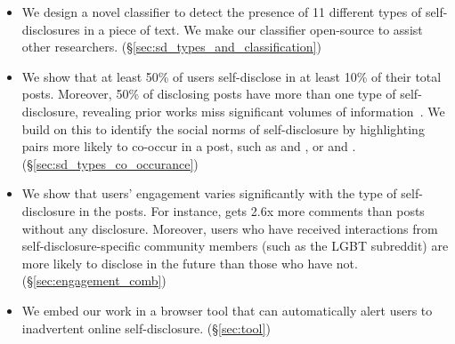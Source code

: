 \begin{itemize}

    \item We design a novel classifier to detect the presence of 11 different types of self-disclosures in a piece of text. We make our classifier open-source to assist other researchers. (\S\ref{sec:sd_types_and_classification})
    
    \item We show that at least 50\% of users self-disclose in at least 10\% of their total posts. Moreover, 50\% of disclosing posts have more than one type of self-disclosure, revealing prior works miss significant volumes of information~\cite{zani_motivating_2022,masur_impact_2023}. We build on this to identify the social norms of self-disclosure by highlighting pairs more likely to co-occur in a post, such as \age and \gender, or \gender and \relationship. (\S\ref{sec:sd_types_co_occurance})
    
    


    \item We show that users' engagement varies significantly with the type of self-disclosure in the posts. For instance, \sexualOrientation gets 2.6x more comments than posts without any disclosure. Moreover, users who have received interactions from self-disclosure-specific community members (such as the LGBT subreddit) are more likely to disclose in the future than those who have not. (\S\ref{sec:engagement_comb})


    \item We embed our work in a browser tool that can automatically alert users to inadvertent online self-disclosure. (\S\ref{sec:tool})

   
\end{itemize}










